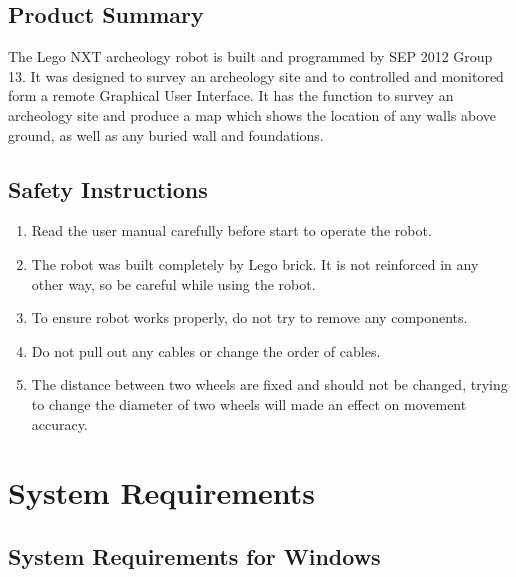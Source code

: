 \documentclass[11pt, a4paper]{report}
\begin{document}
\section{Product Summary}
The Lego NXT archeology robot is built and programmed by SEP 2012 Group 13. It was designed to survey an archeology site and to controlled and monitored form a remote Graphical User Interface.  It has the function to survey an archeology site and produce a map which shows the location of any walls above ground, as well as any buried wall and foundations.


\section{Safety Instructions}

\begin{enumerate}
\item Read the user manual carefully before start to operate the robot.

\item The robot was built completely by Lego brick. It is not reinforced in any other way, so be careful while using the robot.

\item To ensure robot works properly, do not try to remove any components. 

\item Do not pull out any cables or change the order of cables.

\item The distance between two wheels are fixed and should not be changed, trying to change the diameter of two wheels will made an effect on movement accuracy.

\end{enumerate}
\pagebreak


\chapter{System Requirements} %
\label{cha:system_requirements}

\section{System Requirements for Windows} %
\label{sec:system_requirements_for_windows}
\end{document}
